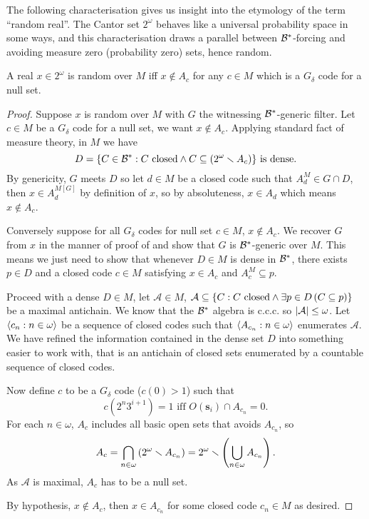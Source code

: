 The following characterisation gives us insight into the etymology of the term ``random real''.
The Cantor set \(2^\omega\) behaves like a universal probability space in some ways, and
this characterisation draws a parallel between \({\mathcal{B}}^*\)-forcing and avoiding measure zero (probability zero) sets,
hence random.
\begin{theorem} \label{theorem:bstar_forcing_avoid_null_set}
    A real \(x\in 2^\omega\) is random over \(M\) iff
    \(x\notin A_c\) for any \(c\in M\) which is a \(G_{\delta}\) code for a null set.
\end{theorem}
\begin{proof}
    Suppose \(x\) is random over \(M\) with \(G\) the witnessing \({\mathcal{B}}^*\)-generic filter.
    Let \(c\in M\) be a \(G_\delta\) code for a null set, we want \(x\notin A_c\).
    Applying standard fact of measure theory, in \(M\) we have
    \[ D = {\left\{  C\in{\mathcal{B}}^*: C\text{ closed} \land C\subseteq \left(2^\omega\smallsetminus A_c\right)  \right\}} \text{ is dense.} \]
    By genericity, \(G\) meets \(D\) so let \(d\in M\) be a closed code such that \(A_d^M \in G\cap D\),
    then \(x\in A_d^{M[G]}\) by definition of \(x\),
    so by absoluteness, \(x\in A_d\) which means \(x\notin A_c\).

    Conversely suppose for all \(G_\delta\) codes for null set \(c\in M\), \(x\notin A_c\).
    We recover \(G\) from \(x\) in the manner of proof of 
    and show that \(G\) is \({\mathcal{B}}^*\)-generic over \(M\).
    This means we just need to show that whenever \(D\in M\) is dense in \({\mathcal{B}}^*\),
    there exists \(p\in D\) and a closed code \(c\in M\) satisfying \(x\in A_c\) and \(A_c^M \subseteq p\).

    Proceed with a dense \(D\in M\), let \(\mathcal{A}\in M\),
    \(\mathcal{A}\subseteq {\left\{ C: C\text{ closed} \land \exists p\in D\left(C\subseteq p\right) \right\}}\)
    be a maximal antichain.
    We know that the \({\mathcal{B}}^*\) algebra is c.c.c. so \(\left\lvert \mathcal{A} \right\rvert \leq \omega\).
    Let \(\left\langle c_n:n \in\omega\right\rangle\) be a sequence of closed codes such that
    \(\left\langle A_{c_n} : n\in \omega \right\rangle\) enumerates \(\mathcal{A}\).
    We have refined the information contained in the dense set \(D\) into something easier to work with,
    that is an antichain of closed sets enumerated by a countable sequence of closed codes.

    Now define \(c\) to be a \(G_\delta\) code (\(c(0) > 1\)) such that
    \[ c(2^n3^{i+1}) = 1 \text{ iff } O(\mathbf{s}_i) \cap A_{c_n} = 0. \]
    For each \(n\in\omega\), \(A_c\) includes all basic open sets that avoids \(A_{c_n}\),
    so \[A_c = \bigcap_{n\in\omega} \left(2^\omega\smallsetminus A_{c_n}\right) = 2^\omega\smallsetminus\left(\bigcup_{n\in\omega} A_{c_n}\right).\]
    As \(\mathcal{A}\) is maximal, \(A_c\) has to be a null set.

    By hypothesis, \(x\notin A_c\), then \(x\in A_{c_n}\) for some closed code \(c_n\in M\) as desired.
\end{proof}


